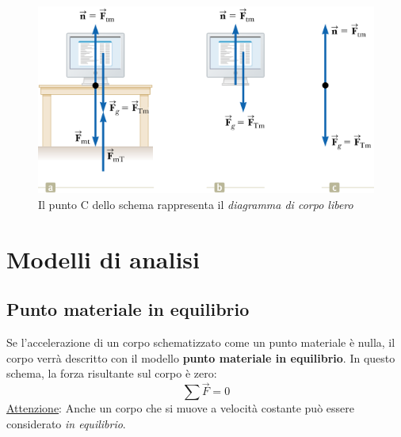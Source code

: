 \documentclass[a4paper,11pt,oneside]{book}
\begin{document}
\begin{figure}[h]
    \centering
    \includegraphics[scale=0.4]{diagramma_corpo_libero}
    \caption*{\small Il punto C dello schema rappresenta il \emph{diagramma di corpo libero}}
\end{figure}

\section{Modelli di analisi}
\subsection{Punto materiale in equilibrio}
Se l’accelerazione di un corpo schematizzato come un punto materiale è nulla, il corpo verrà descritto con il modello \textbf{punto materiale in equilibrio}.
In questo schema, la forza risultante sul corpo è zero:
\begin{equation*}
    \sum \vec{F} = 0
\end{equation*}
\underline{Attenzione}: Anche un corpo che si muove a velocità costante può essere considerato \emph{in equilibrio}.
\end{document}
